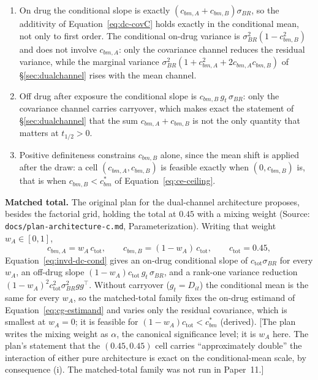 \documentclass[11pt]{article}
\newcommand{\note}[1]{\textcolor{blue!60!black}{\small [#1]}}
\newcommand{\code}[1]{\texttt{#1}}
\begin{document}
\begin{enumerate}[label=(\roman*), itemsep=2pt]
\item On drug the conditional slope is exactly $(c_{bm,A} +
  c_{bm,B})\sigma_{BR}$, so the additivity of
  Equation~\eqref{eq:dc-covC} holds exactly in the conditional mean,
  not only to first order. The conditional on-drug variance is
  $\sigma_{BR}^2(1 - c_{bm,B}^2)$ and does not involve $c_{bm,A}$:
  only the covariance channel reduces the residual variance, while the
  marginal variance $\sigma_{BR}^2(1 + c_{bm,A}^2 + 2c_{bm,A}c_{bm,B})$
  of \S\ref{sec:dualchannel} rises with the mean channel.
\item Off drug after exposure the conditional slope is
  $c_{bm,B}\, g_t\, \sigma_{BR}$: only the covariance channel carries
  carryover, which makes exact the statement of
  \S\ref{sec:dualchannel} that the sum $c_{bm,A} + c_{bm,B}$ is not the
  only quantity that matters at $t_{1/2} > 0$.
\item Positive definiteness constrains $c_{bm,B}$ alone, since the
  mean shift is applied after the draw: a cell $(c_{bm,A}, c_{bm,B})$
  is feasible exactly when $(0, c_{bm,B})$ is, that is when
  $c_{bm,B} < c_{bm}^{\ast}$ of Equation~\eqref{eq:ce-ceiling}.
\end{enumerate}

\textbf{Matched total.} The original plan for the dual-channel
architecture proposes, besides the factorial grid, holding the total at
$0.45$ with a mixing weight (Source:
\code{docs/plan-}\hspace{0pt}\code{architecture-}\hspace{0pt}\code{c.md},
Parameterization). Writing that weight
$w_A \in [0,1]$,
\begin{equation}
c_{bm,A} = w_A\, c_{\mathrm{tot}}, \qquad
c_{bm,B} = (1 - w_A)\, c_{\mathrm{tot}}, \qquad c_{\mathrm{tot}} = 0.45,
\label{eq:invd-matched-total}
\end{equation}
Equation~\eqref{eq:invd-dc-cond} gives an on-drug conditional slope of
$c_{\mathrm{tot}}\sigma_{BR}$ for every $w_A$, an off-drug slope
$(1 - w_A)c_{\mathrm{tot}}\,g_t\,\sigma_{BR}$, and a rank-one variance
reduction $(1 - w_A)^2 c_{\mathrm{tot}}^2 \sigma_{BR}^2 gg^{\top}$.
Without carryover ($g_t = D_{it}$) the conditional mean is the same
for every $w_A$, so the matched-total family fixes the on-drug
estimand of Equation~\eqref{eq:cg-estimand} and varies only the
residual covariance, which is smallest at $w_A = 0$; it is feasible
for $(1 - w_A)c_{\mathrm{tot}} < c_{bm}^{\ast}$ (derived).
\note{The plan writes the mixing weight as $\alpha$, the canonical
significance level; it is $w_A$ here. The plan's statement that the
$(0.45, 0.45)$ cell carries ``approximately double'' the interaction of
either pure architecture is exact on the conditional-mean scale, by
consequence (i). The matched-total family was not run in Paper~11.}
\end{document}
